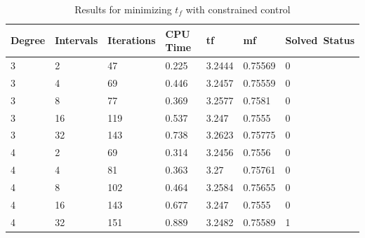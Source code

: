\documentclass[]{article}
\begin{document}
\begin{table}
	\begin{tabular}{lllllll}
		Degree & Intervals & Iterations & CPU Time & tf & mf & Solved\ Status \\ 
		\hline 
		3 & 2 & 47 & 0.225 & 3.2444 & 0.75569 & 0 \\ 
		3 & 4 & 69 & 0.446 & 3.2457 & 0.75559 & 0 \\ 
		3 & 8 & 77 & 0.369 & 3.2577 & 0.7581 & 0 \\ 
		3 & 16 & 119 & 0.537 & 3.247 & 0.7555 & 0 \\ 
		3 & 32 & 143 & 0.738 & 3.2623 & 0.75775 & 0 \\ 
		4 & 2 & 69 & 0.314 & 3.2456 & 0.7556 & 0 \\ 
		4 & 4 & 81 & 0.363 & 3.27 & 0.75761 & 0 \\ 
		4 & 8 & 102 & 0.464 & 3.2584 & 0.75655 & 0 \\ 
		4 & 16 & 143 & 0.677 & 3.247 & 0.7555 & 0 \\ 
		4 & 32 & 151 & 0.889 & 3.2482 & 0.75589 & 1 \\  
		\hline 
	\end{tabular}
	\caption{Results for minimizing \(t_f\) with constrained control}
	\label{table:3}
\end{table}
\FloatBarrier
\end{document}
